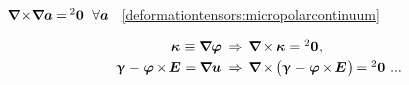 \label{section:compatibilityequations.cosseratcontinuum}

${\boldnabla \hspace{-0.33ex} \times \hspace{-0.5ex} \boldnabla \bm{a} \hspace{-0.1ex} = \hspace{-0.2ex} \zerobivalent \hspace{.6em} \forall \bm{a}}$
~\eqref{deformationtensors:micropolarcontinuum}

\nopagebreak\vspace{-0.8em}\begin{equation}
\begin{array}{r@{\hspace{1ex}}c@{\hspace{1ex}}l}
\wrynesstensor \hspace{.16ex} \equiv \boldnabla \fieldofrotations
& \hspace{.1ex} \Rightarrow &
\boldnabla \hspace{-0.15ex} \times \hspace{-0.1ex} \wrynesstensor \hspace{.1ex} = \zerobivalent
\hspace{.1ex} ,
\\[.3em]
%
\distortiontensor \hspace{.1ex} - \hspace{.1ex} \fieldofrotations \hspace{-0.12ex} \times \hspace{-0.25ex} \UnitDyad \hspace{.12ex} = \hspace{-0.1ex} \boldnabla \fieldofdisplacements \hspace{.1ex}
& \hspace{.1ex} \Rightarrow &
\boldnabla \hspace{-0.15ex} \times \hspace{-0.2ex} \bigl(
\distortiontensor \hspace{.1ex} - \hspace{.1ex} \fieldofrotations \hspace{-0.12ex} \times \hspace{-0.25ex} \UnitDyad \hspace{.12ex}
\bigr) \hspace{-0.22ex}
= \zerobivalent
\hspace{.8ex} ...
\end{array}
\end{equation}

